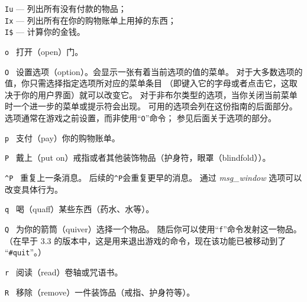 \documentclass[a4paper, 10pt]{article}
\newcommand{\tb}[1]{\tt #1 \hfill}
\begin{document}
{\tt Iu} --- 列出所有没有付款的物品；\\
{\tt Ix} --- 列出所有在你的购物账单上用掉的东西；\\
{\tt I\$} --- 计算你的金钱。
\item[\tb{o}]
打开（open）门。
\item[\tb{O}]
设置选项（option）。会显示一张有着当前选项的值的菜单。
对于大多数选项的值，你只需选择指定选项所对应的菜单条目
（即键入它的字母或者点击它，这取决于你的用户界面）就可以改变它。
对于非布尔类型的选项，当你关闭当前菜单时一个进一步的菜单或提示符会出现。
可用的选项会列在这份指南的后面部分。
选项通常在游戏之前设置，而非使用“{\tt O}”命令；
参见后面关于选项的部分。
\item[\tb{p}]
支付（pay）你的购物账单。
\item[\tb{P}]
戴上（put on）戒指或者其他装饰物品（护身符，眼罩（blindfold））。
\item[\tb{\^{}P}]
重复上一条消息。
后续的{\tt \^{}P}会重复更早的消息。
通过 {\it msg\_window} 选项可以改变具体行为。
\item[\tb{q}]
喝（quaff）某些东西（药水、水等）。
\item[\tb{Q}]
为你的箭筒（quiver）选择一个物品。
随后你可以使用“{\tt f}”命令发射这一物品。
（在早于 3.3 的版本中，这是用来退出游戏的命令，现在该功能已被移动到了
“{\tt \#quit}”。）
\item[\tb{r}]
阅读（read）卷轴或咒语书。
\item[\tb{R}]
移除（remove）一件装饰品（戒指、护身符等）。
\end{document}
